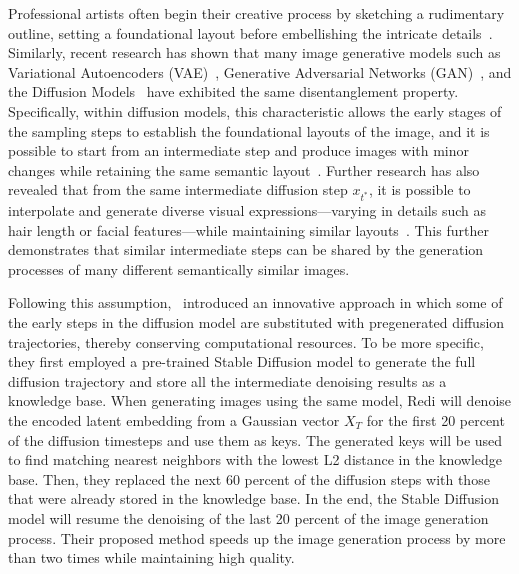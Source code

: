 Professional artists often begin their creative process by sketching a rudimentary outline, setting a foundational layout before embellishing the intricate details~\citet{wolters2012drawing}. Similarly, recent research has shown that many image generative models such as Variational Autoencoders (VAE)~\citet{kim2018disentangling}, Generative Adversarial Networks (GAN)~\citet{karras2020analyzing}, and the Diffusion Models~\citet{yang2023disdiff} have exhibited the same disentanglement property. Specifically, within diffusion models, this characteristic allows the early stages of the sampling steps to establish the foundational layouts of the image, and it is possible to start from an intermediate step and produce images with minor changes while retaining the same semantic layout~\citet{wu2023uncovering}. Further research has also revealed that from the same intermediate diffusion step $x_{t^{*}}$, it is possible to interpolate and generate diverse visual expressions—varying in details such as hair length or facial features—while maintaining similar layouts~\citet{wang2023infodiffusion}. This further demonstrates that similar intermediate steps can be shared by the generation processes of many different semantically similar images. 

Following this assumption,~\citet{zhang2023redi} introduced an innovative approach in which some of the early steps in the diffusion model are substituted with pregenerated diffusion trajectories, thereby conserving computational resources. To be more specific, they first employed a pre-trained Stable Diffusion model to generate the full diffusion trajectory and store all the intermediate denoising results as a knowledge base. When generating images using the same model, Redi will denoise the encoded latent embedding from a Gaussian vector $X_T$ for the first 20 percent of the diffusion timesteps and use them as keys. The generated keys will be used to find matching nearest neighbors with the lowest L2 distance in the knowledge base. Then, they replaced the next 60 percent of the diffusion steps with those that were already stored in the knowledge base. In the end, the Stable Diffusion model will resume the denoising of the last 20 percent of the image generation process. Their proposed method speeds up the image generation process by more than two times while maintaining high quality. 

